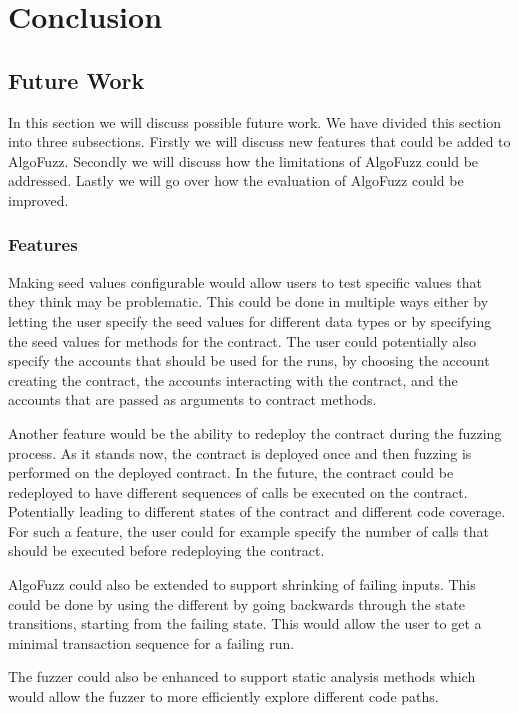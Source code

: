 
\chapter{Conclusion}\label{chapter:conclusion}

\section*{Future Work}
In this section we will discuss possible future work.
We have divided this section into three subsections.
Firstly we will discuss new features that could be added to AlgoFuzz.
Secondly we will discuss how the limitations of AlgoFuzz could be addressed.
Lastly we will go over how the evaluation of AlgoFuzz could be improved.

\subsection*{Features}
Making seed values configurable would allow users to test specific values that they think may be problematic.
This could be done in multiple ways either by letting the user specify the seed values for different data types or by specifying the seed values for methods for the contract.
The user could potentially also specify the accounts that should be used for the runs, by choosing the account creating the contract, the accounts interacting with the contract, and the accounts that are passed as arguments to contract methods.

Another feature would be the ability to redeploy the contract during the fuzzing process.
As it stands now, the contract is deployed once and then fuzzing is performed on the deployed contract.
In the future, the contract could be redeployed to have different sequences of calls be executed on the contract.
Potentially leading to different states of the contract and different code coverage.
For such a feature, the user could for example specify the number of calls that should be executed before redeploying the contract.

AlgoFuzz could also be extended to support shrinking of failing inputs.
This could be done by using the different by going backwards through the state transitions, starting from the failing state.
This would allow the user to get a minimal transaction sequence for a failing run.

The fuzzer could also be enhanced to support static analysis methods which would allow the fuzzer to more efficiently explore different code paths.

